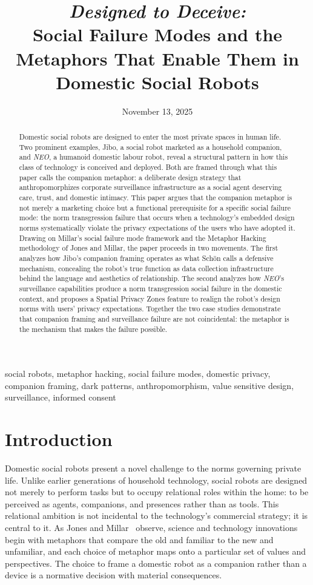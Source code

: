 \documentclass{ieee-portfolio}
\title{\textit{Designed to Deceive:}\\
Social Failure Modes and the Metaphors That Enable Them in Domestic Social Robots}
\date{November 13, 2025}
\author{
    \IEEEauthorblockN{Jaxen Anirban Dutta\,\orcidlink{0009-0002-5088-4679}}
    \IEEEauthorblockA{\textit{School of Engineering Design and Teaching Innovation} \\
    \textit{University of Ottawa, Ottawa, Ontario, Canada} \\
    adutt042@uottawa.ca}
}
\newcommand{\neo}{\textit{NEO}}
\begin{document}
\maketitle

\begin{abstract}
Domestic social robots are designed to enter the most private spaces in human life. Two prominent examples, Jibo, a social robot marketed as a household companion, and \neo{}, a humanoid domestic labour robot, reveal a structural pattern in how this class of technology is conceived and deployed. Both are framed through what this paper calls the companion metaphor: a deliberate design strategy that anthropomorphizes corporate surveillance infrastructure as a social agent deserving care, trust, and domestic intimacy. This paper argues that the companion metaphor is not merely a marketing choice but a functional prerequisite for a specific social failure mode: the norm transgression failure that occurs when a technology's embedded design norms systematically violate the privacy expectations of the users who have adopted it. Drawing on Millar's social failure mode framework and the Metaphor Hacking methodology of Jones and Millar, the paper proceeds in two movements. The first analyzes how Jibo's companion framing operates as what Sch\"{o}n calls a defensive mechanism, concealing the robot's true function as data collection infrastructure behind the language and aesthetics of relationship. The second analyzes how \neo{}'s surveillance capabilities produce a norm transgression social failure in the domestic context, and proposes a Spatial Privacy Zones feature to realign the robot's design norms with users' privacy expectations. Together the two case studies demonstrate that companion framing and surveillance failure are not coincidental: the metaphor is the mechanism that makes the failure possible.
\end{abstract}

\begin{IEEEkeywords}
social robots, metaphor hacking, social failure modes, domestic privacy, companion framing, dark patterns, anthropomorphism, value sensitive design, surveillance, informed consent
\end{IEEEkeywords}

\section{Introduction}

Domestic social robots present a novel challenge to the norms governing private life. Unlike earlier generations of household technology, social robots are designed not merely to perform tasks but to occupy relational roles within the home: to be perceived as agents, companions, and presences rather than as tools. This relational ambition is not incidental to the technology's commercial strategy; it is central to it. As Jones and Millar~\cite{jones_hacking_2017} observe, science and technology innovations begin with metaphors that compare the old and familiar to the new and unfamiliar, and each choice of metaphor maps onto a particular set of values and perspectives. The choice to frame a domestic robot as a companion rather than a device is a normative decision with material consequences.
\end{document}
